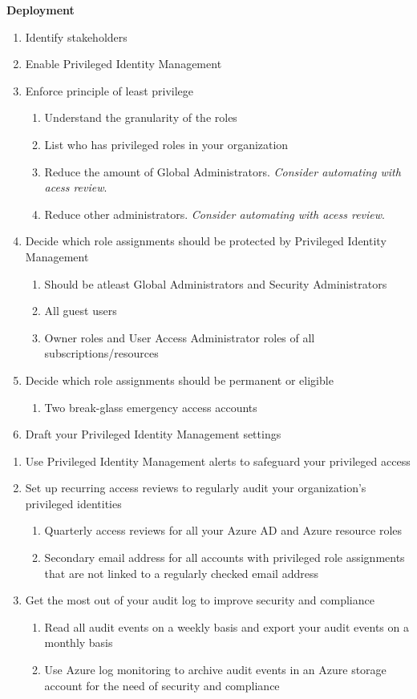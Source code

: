 \textbf{Deployment} 
\begin{enumerate}
\item Identify stakeholders
\item Enable Privileged Identity Management
\item Enforce principle of least privilege
	\begin{enumerate}
	\item Understand the granularity of the roles
	\item List who has privileged roles in your organization
	\item Reduce the amount of Global Administrators. \textit{Consider automating with acess review}.
	\item Reduce other administrators. \textit{Consider automating with acess review}.
	\end{enumerate}
\item Decide which role assignments should be protected by Privileged Identity Management
	\begin{enumerate}
	\item Should be atleast Global Administrators and Security Administrators
	\item All guest users
	\item Owner roles and User Access Administrator roles of all subscriptions/resources
	\end{enumerate}
\item Decide which role assignments should be permanent or eligible
	\begin{enumerate}
	\item Two break-glass emergency access accounts
	\end{enumerate}
\item Draft your Privileged Identity Management settings
\end{enumerate}
\begin{enumerate}
\item Use Privileged Identity Management alerts to safeguard your privileged access
\item Set up recurring access reviews to regularly audit your organization’s privileged identities
	\begin{enumerate}
	\item Quarterly access reviews for all your Azure AD and Azure resource roles
	\item Secondary email address for all accounts with privileged role assignments that are not linked to a regularly checked email address
	\end{enumerate}
\item Get the most out of your audit log to improve security and compliance
	\begin{enumerate}
	\item Read all audit events on a weekly basis and export your audit events on a monthly basis
	\item Use Azure log monitoring to archive audit events in an Azure storage account for the need of security and compliance
	\end{enumerate}
\end{enumerate}

